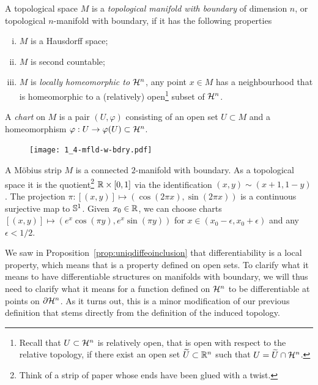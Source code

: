 \begin{definition}
  A topological space $M$ is a \emph{topological manifold with boundary} of dimension $n$, or topological $n$-manifold with boundary, if it has the following properties
  \begin{enumerate}[(i)]
    \item $M$ is a Hausdorff space;
    \item $M$ is second countable;
    \item $M$ is \emph{locally homeomorphic to $\mathcal{H}^n$}, any point $x\in M$ has a neighbourhood that is homeomorphic to a (relatively) open\footnote{Recall that $U\subset\mathcal{H}^n$ is relatively open, that is open with respect to the relative topology, if there exist an open set $\widetilde U\subset\mathbb{R}^n$ such that $U = \widetilde U \cap \mathcal{H}^n$.} subset of $\mathcal{H}^n$.
  \end{enumerate}

  A \emph{chart} on $M$ is a pair $(U, \varphi)$ consisting of an open set $U\subset M$ and a homeomorphism $\varphi: U \to \varphi(U)\subset \mathcal{H}^n$.
\end{definition}

\begin{figure}
  \texttt{[image: 1\_4-mfld-w-bdry.pdf]}
\end{figure}

\begin{example}\label{ex:mobius}
  A M\"obius strip $M$ is a connected $2$-manifold with boundary.
  As a topological space it is the quotient\footnote{Think of a strip of paper whose ends have been glued with a twist.} $\mathbb{R}\times[0,1]$ via the identification $(x,y)\sim(x+1, 1-y)$.
  The projection $\pi: [(x,y)] \mapsto (\cos(2\pi x), \sin(2\pi x))$ is a continuous surjective map to $\mathbb{S}^1$.
  Given $x_0\in\mathbb{R}$, we can choose charts $[(x,y)]\mapsto (e^x\cos(\pi y), e^x\sin(\pi y))$ for $x\in(x_0 - \epsilon, x_0 + \epsilon)$ and any $\epsilon < 1/2$.
\end{example}

We saw in Proposition~\ref{prop:uniqdiffeoinclusion} that differentiability is a local property, which means that is a property defined on open sets.
To clarify what it means to have differentiable structures on manifolds with boundary, we will thus need to clarify what it means for a function defined on $\mathcal{H}^n$ to be differentiable at points on $\partial\mathcal{H}^n$.
As it turns out, this is a minor modification of our previous definition that stems directly from the definition of the induced topology.

